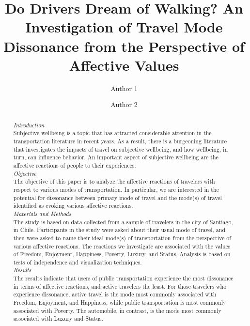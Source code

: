 \documentclass[]{elsarticle} %
\begin{document}
\begin{frontmatter}

  \title{Do Drivers Dream of Walking? An Investigation of Travel Mode Dissonance
from the Perspective of Affective Values}
    \author[Some University]{Author 1}
    \author[Some School]{Author 2}
      \address[Some University]{Department, Street, City, State, Zip}
    \address[Some School]{Department, Street, City, State, Zip}
    
  \begin{abstract}
  \emph{Introduction}\\
  Subjective wellbeing is a topic that has attracted considerable
  attention in the transportation literature in recent years. As a result,
  there is a burgeoning literature that investigates the impacts of travel
  on subjective wellbeing, and how wellbeing, in turn, can influence
  behavior. An important aspect of subjective wellbeing are the affective
  reactions of people to their experiences.\\
  \emph{Objective}\\
  The objective of this paper is to analyze the affective reactions of
  travelers with respect to various modes of transportation. In
  particular, we are interested in the potential for dissonance between
  primary mode of travel and the mode(s) of travel identified as evoking
  various affective reactions.\\
  \emph{Materials and Methods}\\
  The study is based on data collected from a sample of travelers in the
  city of Santiago, in Chile. Participants in the study were asked about
  their usual mode of travel, and then were asked to name their ideal
  mode(s) of transportation from the perspective of various affective
  reactions. The reactions we investigate are associated with the values
  of Freedom, Enjoyment, Happiness, Poverty, Luxury, and Status. Analysis
  is based on tests of independence and visualization techniques.\\
  \emph{Results}\\
  The results indicate that users of public transportation experience the
  most dissonance in terms of affective reactions, and active travelers
  the least. For those travelers who experience dissonance, active travel
  is the mode most commonly associated with Freedom, Enjoyment, and
  Happiness, while public transportation is most commonly associated with
  Poverty. The automobile, in contrast, is the mode most commonly
  associated with Luxury and Status.
  \end{abstract}
  
 \end{frontmatter}
\end{document}
